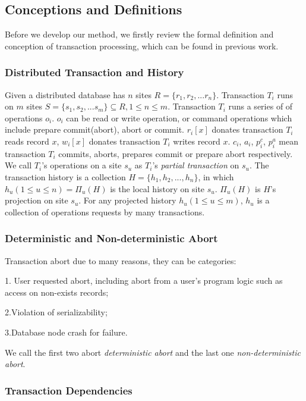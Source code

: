 \documentclass[conference]{IEEEtran}
\begin{document}
\subsection{Conceptions and Definitions}
Before we develop our method, we firstly review the formal definition and conception of transaction processing, which can be found in previous work\cite{LockNoWait:journals/csur/BernsteinG81}.

\subsubsection{Distributed Transaction and History}
Given a distributed database has ${n}$
sites ${R = \{r_1, r_2, ... r_n\}}$.
Transaction ${T_i}$ runs on ${m}$ sites  ${S = \{s_1, s_2, ... s_m\} \subseteq R, 1 \le n \le m }$.
Transaction ${T_i}$ runs a series of of operations $o_i$.
$o_i$ can be read or write operation, or command operations which include prepare commit(abort), abort or commit.
${r_i[x]}$ donates transaction ${T_i}$ reads record ${x}$,  ${w_i[x]}$ donates transaction ${T_i}$ writes record ${x}$.
${c_i}$, ${a_i}$, ${p^c_i}$, ${p^a_i}$ mean transaction ${T_i}$ commits, aborts, prepares commit or prepare abort respectively.
We call ${T_i}$'s operations on a site ${s_u}$ as ${T_i}$'s \emph{partial transaction} on ${s_u}$.
The transaction history is a collection ${H = \{h_1, h_2, ..., h_n\}}$,
in which ${h_u (1 \le u \le n) = \Pi_u(H)}$ is the local history on site ${s_u}$.
${\Pi_u(H)}$ is ${H}$'s projection on site ${s_u}$.
For any projected history ${h_u(1 \le u \le m)}$, ${h_{u} }$ is a collection of  operations requests by many transactions.

\subsubsection{Deterministic and Non-deterministic Abort}
Transaction abort due to many reasons, they can be categories:

1. User requested abort, including abort from a user's program logic such as access on non-exists records;

2.Violation of serializability;

3.Database node crash for failure.

We call the first two abort  \emph{deterministic abort} and the last one \emph{non-deterministic abort}.

\subsubsection{Transaction Dependencies}
\end{document}
